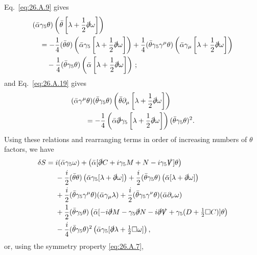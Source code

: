 Eq.~\eqref{eq:26.A.9} gives
\[
  \begin{aligned}
  &(\bar\alpha\gamma_5\theta)
    \left(\bar\theta\left[\lambda+\frac12\sl{\partial}\omega\right]\right)\\
  &\quad=-\frac14(\bar\theta\theta)
    \left(\bar\alpha\gamma_5
      \left[\lambda+\frac12\sl{\partial}\omega\right]\right)
  +\frac14(\bar\theta\gamma_5\gamma^\mu\theta)
    \left(\bar\alpha\gamma_\mu
      \left[\lambda+\frac12\sl{\partial}\omega\right]\right)\\
  &\qquad-\frac14(\bar\theta\gamma_5\theta)
    \left(\bar\alpha
      \left[\lambda+\frac12\sl{\partial}\omega\right]\right)\,;
  \end{aligned}
\]
and Eq.~\eqref{eq:26.A.19} gives
\[
  \begin{aligned}
  &(\bar\alpha\gamma^\mu\theta)(\bar\theta\gamma_5\theta)
    \left(\bar\theta\partial_\mu
      \left[\lambda+\frac12\sl{\partial}\omega\right]\right)\\
  &\qquad=-\frac14
    \left(\bar\alpha\sl{\partial}\gamma_5
      \left[\lambda+\frac12\sl{\partial}\omega\right]\right)
    (\bar\theta\gamma_5\theta)^2.
  \end{aligned}
\]
Using these relations and rearranging terms in order of increasing numbers of
$\theta$ factors, we have
\[
  \begin{aligned}
  \delta S={}&i(\bar\alpha\gamma_5\omega)
  +\left(\bar\alpha
    [\sl{\partial}C+i\gamma_5M+N-i\gamma_5\sl{V}]\theta\right)\\
  &-\frac{i}{2}(\bar\theta\theta)
    \left(\bar\alpha\gamma_5[\lambda+\sl{\partial}\omega]\right)
  +\frac{i}{2}(\bar\theta\gamma_5\theta)
    \left(\bar\alpha[\lambda+\sl{\partial}\omega]\right)\\
  &+\frac{i}{2}(\bar\theta\gamma_5\gamma^\mu\theta)
    (\bar\alpha\gamma_\mu\lambda)
  +\frac{i}{2}(\bar\theta\gamma_5\gamma^\nu\theta)
    (\bar\alpha\partial_\nu\omega)\\
  &+\frac12(\bar\theta\gamma_5\theta)
    \left(\bar\alpha
      [-i\sl{\partial}M-\gamma_5\sl{\partial}N
       -i\sl{\partial}\sl{V}
       +\gamma_5(D+\tfrac12\Box C)]\theta\right)\\
  &-\frac{i}{4}(\bar\theta\gamma_5\theta)^2
    \left(\bar\alpha\gamma_5
      [\sl{\partial}\lambda+\tfrac12\Box\omega]\right),
  \end{aligned}
\]
or, using the symmetry property \eqref{eq:26.A.7},
